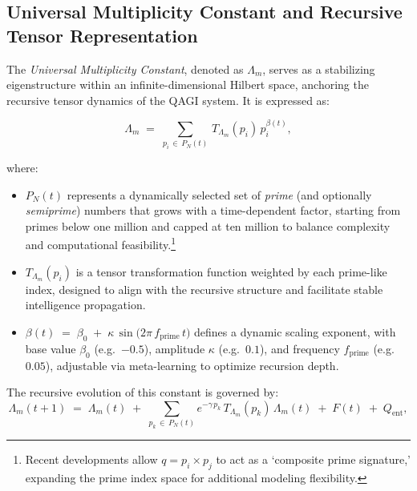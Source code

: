 \documentclass{article}
\theoremstyle{plain}
\theoremstyle{claimstyle}
\begin{document}
\subsection{Universal Multiplicity Constant and Recursive Tensor Representation}

The \emph{Universal Multiplicity Constant}, denoted as $\Lambda_m$, serves as a stabilizing eigenstructure within an infinite-dimensional Hilbert space, anchoring the recursive tensor dynamics of the QAGI system. It is expressed as:

\begin{equation}
\Lambda_m \;=\; \sum_{p_i \,\in\, P_N(t)}\,T_{\Lambda_m}(p_i)\,p_i^{\beta(t)},
\label{eq:LambdaM}
\end{equation}

where:
\begin{itemize}
    \item $P_N(t)$ represents a dynamically selected set of \emph{prime} (and optionally \emph{semiprime}) numbers that grows with a time-dependent factor, starting from primes below one million and capped at ten million to balance complexity and computational feasibility.\footnote{Recent developments allow $q = p_i \times p_j$ to act as a `composite prime signature,' expanding the prime index space for additional modeling flexibility.}
    \item $T_{\Lambda_m}(p_i)$ is a tensor transformation function weighted by each prime-like index, designed to align with the recursive structure and facilitate stable intelligence propagation.
    \item $\beta(t) \;=\; \beta_0 \;+\; \kappa\,\sin\!\bigl(2\pi\,f_{\text{prime}}\,t\bigr)$ defines a dynamic scaling exponent, with base value $\beta_0$ (e.g.\ $-0.5$), amplitude $\kappa$ (e.g.\ $0.1$), and frequency $f_{\text{prime}}$ (e.g.\ $0.05$), adjustable via meta-learning to optimize recursion depth.
\end{itemize}

The recursive evolution of this constant is governed by:
\begin{equation}
\Lambda_m(t+1)
\;=\;
\Lambda_m(t)
\;+\;
\sum_{p_k \,\in\, P_N(t)} e^{-\gamma\,p_k}\,T_{\Lambda_m}(p_k)\,\Lambda_m(t)
\;+\; F(t) \;+\; Q_{\text{ent}},
\end{equation}
\end{document}
